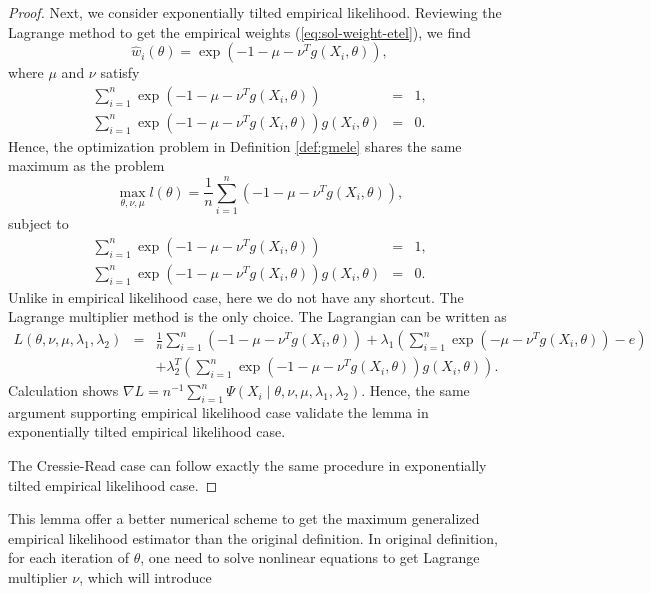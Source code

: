 \documentclass[oneside,english]{amsbook}
\numberwithin{section}{chapter}
\numberwithin{equation}{section}
\numberwithin{figure}{section}
\theoremstyle{plain}
\theoremstyle{plain}
\theoremstyle{definition}
\theoremstyle{plain}
\theoremstyle{plain}
\theoremstyle{remark}
\theoremstyle{definition}
\theoremstyle{definition}
\begin{document}
\begin{proof}
Next, we consider exponentially tilted empirical likelihood. Reviewing
the Lagrange method to get the empirical weights (\ref{eq:sol-weight-etel}),
we find 
\[
\hat{w}_{i}\left(\theta\right)=\exp\left(-1-\mu-\nu^{T}g\left(X_{i},\theta\right)\right),
\]
where $\mu$ and $\nu$ satisfy 
\begin{eqnarray*}
\sum_{i=1}^{n}\exp\left(-1-\mu-\nu^{T}g\left(X_{i},\theta\right)\right) & = & 1,\\
\sum_{i=1}^{n}\exp\left(-1-\mu-\nu^{T}g\left(X_{i},\theta\right)\right)g\left(X_{i},\theta\right) & = & 0.
\end{eqnarray*}
 Hence, the optimization problem in Definition \ref{def:gmele} shares
the same maximum as the problem 
\[
\max_{\theta,\nu,\mu}l\left(\theta\right)=\frac{1}{n}\sum_{i=1}^{n}\left(-1-\mu-\nu^{T}g\left(X_{i},\theta\right)\right),
\]
subject to 
\begin{eqnarray*}
\sum_{i=1}^{n}\exp\left(-1-\mu-\nu^{T}g\left(X_{i},\theta\right)\right) & = & 1,\\
\sum_{i=1}^{n}\exp\left(-1-\mu-\nu^{T}g\left(X_{i},\theta\right)\right)g\left(X_{i},\theta\right) & = & 0.
\end{eqnarray*}
Unlike in empirical likelihood case, here we do not have any shortcut.
The Lagrange multiplier method is the only choice. The Lagrangian
can be written as 
\begin{eqnarray*}
L\left(\theta,\nu,\mu,\lambda_{1},\lambda_{2}\right) & = & \frac{1}{n}\sum_{i=1}^{n}\left(-1-\mu-\nu^{T}g\left(X_{i},\theta\right)\right)+\lambda_{1}\left(\sum_{i=1}^{n}\exp\left(-\mu-\nu^{T}g\left(X_{i},\theta\right)\right)-e\right)\\
 &  & +\lambda_{2}^{T}\left(\sum_{i=1}^{n}\exp\left(-1-\mu-\nu^{T}g\left(X_{i},\theta\right)\right)g\left(X_{i},\theta\right)\right).
\end{eqnarray*}
Calculation shows $\nabla L=n^{-1}\sum_{i=1}^{n}\Psi\left(X_{i}\mid\theta,\nu,\mu,\lambda_{1},\lambda_{2}\right)$.
Hence, the same argument supporting empirical likelihood case validate
the lemma in exponentially tilted empirical likelihood case.

The Cressie-Read case can follow exactly the same procedure in exponentially
tilted empirical likelihood case.
\end{proof}
This lemma offer a better numerical scheme to get the maximum generalized
empirical likelihood estimator than the original definition. In original
definition, for each iteration of $\theta$, one need to solve nonlinear
equations to get Lagrange multiplier $\nu$, which will introduce
\end{document}
